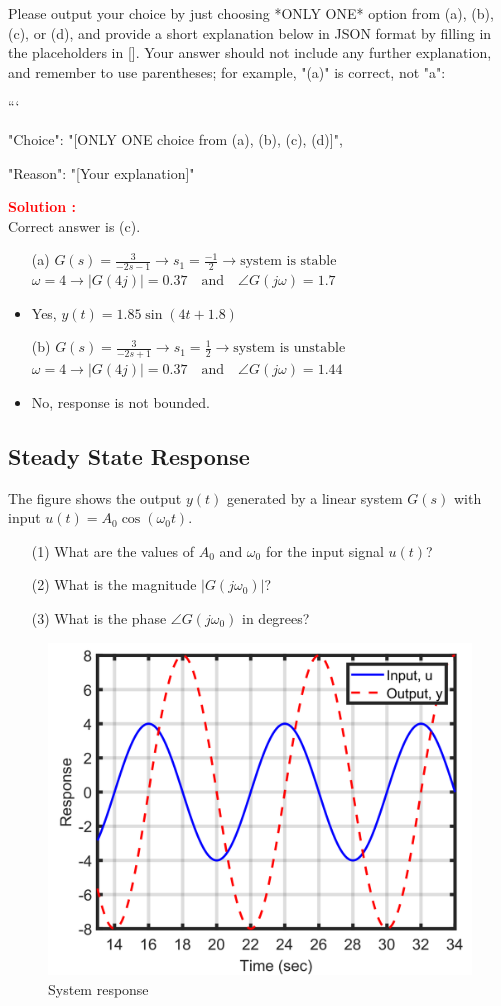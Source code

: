 \documentclass[12pt]{article}
\begin{document}
Please output your choice by just choosing *ONLY ONE* option from (a), (b), (c), or (d), and provide a short explanation below in JSON format by filling in the placeholders in []. Your answer should not include any further explanation, and remember to use parentheses; for example, "(a)" is correct, not "a": 

```
{

"Choice": "[ONLY ONE choice from (a), (b), (c), (d)]",

"Reason": "[Your explanation]"

}


\textbf{\textcolor{red}{Solution :}}\\
Correct answer is (c).\\
\begin{itemize}
    \item[(a)] \(G(s) = \frac{3}{-2s-1} \rightarrow s_1 = \frac{-1}{2} \rightarrow \text{system is stable}\) \\ \(\omega = 4 \rightarrow |G(4j)| = 0.37 \quad \text{and} \quad \angle G(j\omega) = 1.7 \)
    \item Yes, \(y(t) = 1.85 \sin(4t+1.8)\)
    \item[(b)] \(G(s) = \frac{3}{-2s+1} \rightarrow s_1 = \frac{1}{2} \rightarrow \text{system is unstable}\) \\ \(\omega = 4 \rightarrow |G(4j)| = 0.37 \quad \text{and} \quad \angle G(j\omega) = 1.44 \)
    \item No, response is not bounded.
\end{itemize}
\clearpage

\subsection{Steady State Response}

The figure shows the output \(y(t)\) generated by a linear system \(G(s)\) with input \(u(t) = A_0 \cos(\omega_0 t)\).
\begin{itemize}
    \item[(1)] What are the values of \(A_0\) and \(\omega_0\) for the input signal \(u(t)\)?
    \item[(2)] What is the magnitude \(|G(j\omega_0)|\)?
    \item[(3)] What is the phase \(\angle G(j\omega_0)\) in degrees?
\end{itemize}
\begin{figure}[h]
\centering
\includegraphics[width=0.7\linewidth]{figs/3.15.png}
\caption{System response}
\end{figure}
\end{document}

